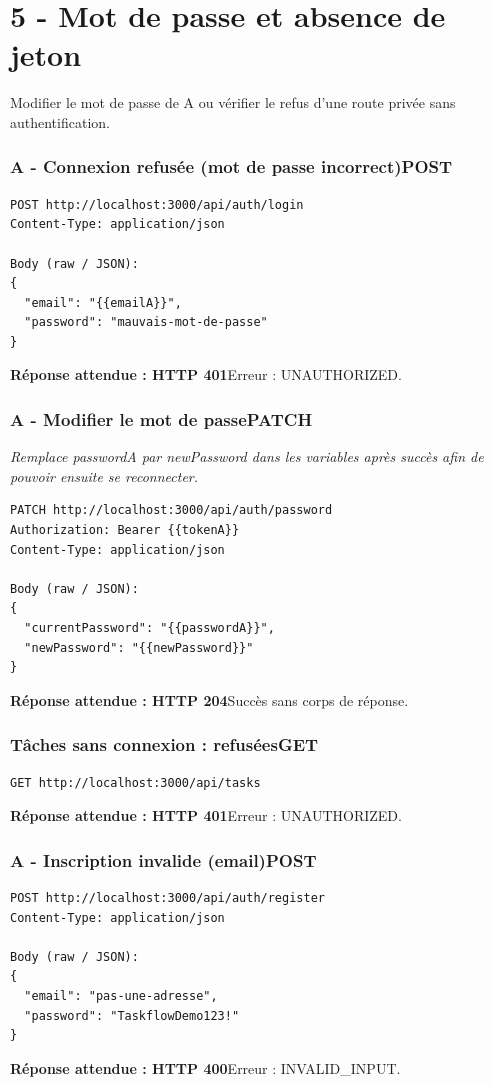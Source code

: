 \documentclass[10pt,a4paper]{article}
\newcommand{\expected}[2]{\par\smallskip\noindent\colorbox{forest!9}{\parbox{\dimexpr\linewidth-2\fboxsep}{\textcolor{forest}{\textbf{Réponse attendue : HTTP #1}}\hspace{0.4em}#2}}\par\medskip}
\newcommand{\reqheading}[3]{\subsubsection*{\textcolor{forest}{#1}\hfill\textcolor{ink}{\small #2}}\textit{#3}\par}
\begin{document}
\section{5 - Mot de passe et absence de jeton}
Modifier le mot de passe de A ou vérifier le refus d'une route privée sans authentification.
\reqheading{A - Connexion refusée (mot de passe incorrect)}{POST}{}
\begin{lstlisting}[style=requestcode]
POST http://localhost:3000/api/auth/login
Content-Type: application/json

Body (raw / JSON):
{
  "email": "{{emailA}}",
  "password": "mauvais-mot-de-passe"
}
\end{lstlisting}
\expected{401}{Erreur : UNAUTHORIZED.}
\vspace{0.25em}
\reqheading{A - Modifier le mot de passe}{PATCH}{Remplace passwordA par newPassword dans les variables après succès afin de pouvoir ensuite se reconnecter.}
\begin{lstlisting}[style=requestcode]
PATCH http://localhost:3000/api/auth/password
Authorization: Bearer {{tokenA}}
Content-Type: application/json

Body (raw / JSON):
{
  "currentPassword": "{{passwordA}}",
  "newPassword": "{{newPassword}}"
}
\end{lstlisting}
\expected{204}{Succès sans corps de réponse.}
\vspace{0.25em}
\reqheading{Tâches sans connexion : refusées}{GET}{}
\begin{lstlisting}[style=requestcode]
GET http://localhost:3000/api/tasks
\end{lstlisting}
\expected{401}{Erreur : UNAUTHORIZED.}
\vspace{0.25em}
\reqheading{A - Inscription invalide (email)}{POST}{}
\begin{lstlisting}[style=requestcode]
POST http://localhost:3000/api/auth/register
Content-Type: application/json

Body (raw / JSON):
{
  "email": "pas-une-adresse",
  "password": "TaskflowDemo123!"
}
\end{lstlisting}
\expected{400}{Erreur : INVALID\_INPUT.}
\vspace{0.25em}
\newpage
\end{document}
